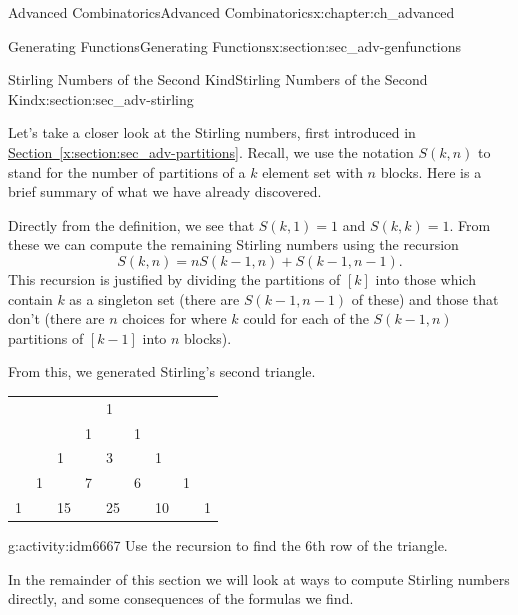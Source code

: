 \documentclass[oneside,10pt,]{book}
\numberwithin{equation}{chapter}
\begin{document}
\begin{chapterptx}{Advanced Combinatorics}{}{Advanced Combinatorics}{}{}{x:chapter:ch_advanced}
\begin{sectionptx}{Generating Functions}{}{Generating Functions}{}{}{x:section:sec_adv-genfunctions}
\end{sectionptx}
%
%
\typeout{************************************************}
\typeout{************************************************}
%
\begin{sectionptx}{Stirling Numbers of the Second Kind}{}{Stirling Numbers of the Second Kind}{}{}{x:section:sec_adv-stirling}
\begin{introduction}{}%
Let's take a closer look at the Stirling numbers, first introduced in \hyperref[x:section:sec_adv-partitions]{Section~\ref{x:section:sec_adv-partitions}}.  Recall, we use the notation \(S(k,n)\) to stand for the number of partitions of a \(k\) element set with \(n\) blocks.  Here is a brief summary of what we have already discovered.%
\par
Directly from the definition, we see that \(S(k,1) = 1\) and \(S(k,k) = 1\).  From these we can compute the remaining Stirling numbers using the recursion%
\begin{equation*}
S(k,n) = nS(k-1,n) + S(k-1, n-1).
\end{equation*}
This recursion is justified by dividing the partitions of \([k]\) into those which contain \(k\) as a singleton set (there are \(S(k-1, n-1)\) of these) and those that don't (there are \(n\) choices for where \(k\) could for each of the \(S(k-1, n)\) partitions of \([k-1]\) into \(n\) blocks).%
\par
From this, we generated Stirling's second triangle.%
\begin{sidebyside}{1}{0.25}{0.25}{0}%
\begin{sbspanel}{0.5}%
{\centering%
\begin{tabular}{lllllllll}
&&&&1&&&&\tabularnewline[0pt]
&&&1&&1&&&\tabularnewline[0pt]
&&1&&3&&1&&\tabularnewline[0pt]
&1&&7&&6&&1&\tabularnewline[0pt]
1&&15&&25&&10&&1
\end{tabular}
\par}
\end{sbspanel}%
\end{sidebyside}%
\begin{activity}{}{g:activity:idm6667}%
Use the recursion to find the 6th row of the triangle.%
\end{activity}
In the remainder of this section we will look at ways to compute Stirling numbers directly, and some consequences of the formulas we find.%
\end{introduction}%
%
%
\typeout{************************************************}

\end{sectionptx}
\end{chapterptx}
\end{document}
